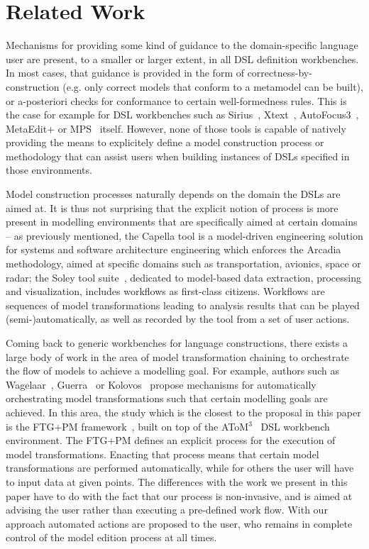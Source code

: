 \section{Related Work}
\label{sec:related_work}

Mechanisms for providing some kind of guidance to the domain-specific
language user are present, to a smaller or larger extent, in all DSL definition
workbenches. In most cases, that guidance is provided in the form of
correctness-by-construction (e.g. only correct models that conform to a
metamodel can be built), or a-posteriori checks for conformance to certain
well-formedness rules. This is the case for example for DSL workbenches such as
Sirius~\cite{DBLP:conf/asplos/HauswaldLZLRKDM15},
Xtext~\cite{DBLP:conf/oopsla/EysholdtB10}, AutoFocus3~\cite{AF315},
MetaEdit+\cite{DBLP:conf/sle/Tolvanen16} or MPS~\cite{DBLP:conf/pppj/PechSV13}
itself. However, none of those tools is capable of natively providing the means
to explicitely define a model construction process or methodology that can
assist users when building instances of DSLs specified in those environments.

Model construction processes naturally depends on the domain the DSLs are aimed
at. It is thus not surprising that the explicit notion of process is more
present in modelling environments that are specifically aimed at certain domains
-- as previously mentioned, the Capella tool is a model-driven engineering
solution for systems and software architecture engineering which enforces the
Arcadia~\cite{DBLP:conf/syscon/BonnetVEN16} methodology, aimed at specific
domains such as transportation, avionics, space or radar; the Soley tool
suite~\cite{soley}, dedicated to model-based data extraction, processing and
visualization, includes workflows as first-class citizens.
Workflows are sequences of model transformations leading to analysis results
that can be played (semi-)automatically, as well as recorded by the tool from a
set of user actions.

Coming back to generic workbenches for language constructions, there exists
a large body of work in the area of model transformation chaining to orchestrate
the flow of models to achieve a modelling goal. For example, authors
such as Wagelaar~\cite{wagelaar2006blackbox}, Guerra~\cite{transml} or
Kolovos~\cite{Kolovos2008} propose mechanisms for automatically orchestrating
model transformations such that certain modelling goals are achieved. In this
area, the study which is the closest to the proposal in this paper is the
FTG+PM framework~\cite{DBLP:conf/sdl/LucioMDVJ13,MustafizDLV12}, built on top of
the AToM$^3$~\cite{Lara2002} DSL workbench environment. The FTG+PM defines an
explicit process for the execution of model transformations.
Enacting that process means that certain model transformations are performed
automatically, while for others the user will have to input data at given
points. The differences with the work we present in this paper have to do with
the fact that our process is non-invasive, and is aimed at advising the user
rather than executing a pre-defined work flow. With our approach automated actions are
proposed to the user, who remains in complete control of the model edition process at all
times.

